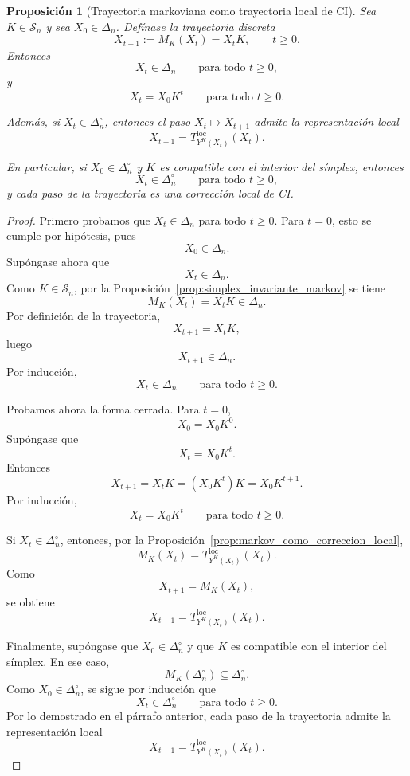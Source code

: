 ﻿\documentclass[12pt]{article}
\newtheorem{proposicion}{Proposición}[section]
\begin{document}
\begin{proposicion}[Trayectoria markoviana como trayectoria local de CI]\label{prop:trayectoria_markov_CI}
Sea \(K\in\mathcal S_n\) y sea \(X_0\in\Delta_n\). Defínase la trayectoria discreta
\[
X_{t+1}:=M_K(X_t)=X_tK,
\qquad t\ge 0.
\]
Entonces
\[
X_t\in\Delta_n
\qquad
\text{para todo }t\ge 0,
\]
y
\[
X_t=X_0K^t
\qquad
\text{para todo }t\ge 0.
\]

Además, si \(X_t\in\Delta_n^\circ\), entonces el paso \(X_t\mapsto X_{t+1}\) admite la representación local
\[
X_{t+1}
=
T^{\mathrm{loc}}_{Y^K(X_t)}(X_t).
\]

En particular, si \(X_0\in\Delta_n^\circ\) y \(K\) es compatible con el interior del símplex, entonces
\[
X_t\in\Delta_n^\circ
\qquad
\text{para todo }t\ge 0,
\]
y cada paso de la trayectoria es una corrección local de CI.
\end{proposicion}

\begin{proof}
Primero probamos que \(X_t\in\Delta_n\) para todo \(t\ge 0\). Para \(t=0\), esto se cumple por hipótesis, pues
\[
X_0\in\Delta_n.
\]
Supóngase ahora que
\[
X_t\in\Delta_n.
\]
Como \(K\in\mathcal S_n\), por la Proposición~\ref{prop:simplex_invariante_markov} se tiene
\[
M_K(X_t)=X_tK\in\Delta_n.
\]
Por definición de la trayectoria,
\[
X_{t+1}=X_tK,
\]
luego
\[
X_{t+1}\in\Delta_n.
\]
Por inducción,
\[
X_t\in\Delta_n
\qquad
\text{para todo }t\ge 0.
\]

Probamos ahora la forma cerrada. Para \(t=0\),
\[
X_0=X_0K^0.
\]
Supóngase que
\[
X_t=X_0K^t.
\]
Entonces
\[
X_{t+1}
=
X_tK
=
(X_0K^t)K
=
X_0K^{t+1}.
\]
Por inducción,
\[
X_t=X_0K^t
\qquad
\text{para todo }t\ge 0.
\]

Si \(X_t\in\Delta_n^\circ\), entonces, por la Proposición~\ref{prop:markov_como_correccion_local},
\[
M_K(X_t)
=
T^{\mathrm{loc}}_{Y^K(X_t)}(X_t).
\]
Como
\[
X_{t+1}=M_K(X_t),
\]
se obtiene
\[
X_{t+1}
=
T^{\mathrm{loc}}_{Y^K(X_t)}(X_t).
\]

Finalmente, supóngase que \(X_0\in\Delta_n^\circ\) y que \(K\) es compatible con el interior del símplex. En ese caso,
\[
M_K(\Delta_n^\circ)\subseteq\Delta_n^\circ.
\]
Como \(X_0\in\Delta_n^\circ\), se sigue por inducción que
\[
X_t\in\Delta_n^\circ
\qquad
\text{para todo }t\ge 0.
\]
Por lo demostrado en el párrafo anterior, cada paso de la trayectoria admite la representación local
\[
X_{t+1}
=
T^{\mathrm{loc}}_{Y^K(X_t)}(X_t).
\]
\end{proof}
\end{document}
